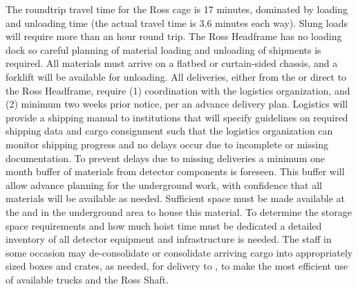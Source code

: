 The roundtrip travel time for the Ross cage is 17 minutes, dominated by loading and unloading time (the actual travel time is 3.6 minutes each way).
Slung loads will require more than an hour round trip.
The Ross Headframe has no loading dock so careful planning of material loading and unloading of shipments is required.
All materials must arrive on a flatbed or curtain-sided chassis, and a
forklift will be available for unloading.
All deliveries, either from the  or direct to the Ross Headframe, require (1) coordination with the  logistics organization, and (2) minimum two weeks prior notice, per an advance delivery plan.
Logistics will provide a shipping manual to  institutions that will specify guidelines on required shipping data and cargo consignment such that the logistics organization can monitor shipping progress and no delays occur due to incomplete or missing documentation.
To prevent delays due to missing deliveries a minimum one month buffer of materials from detector components is foreseen.
This buffer will allow advance planning for the underground work, with confidence that all materials will be available as needed.
Sufficient space must be made available at the  and in the underground area to house this material.
To determine the storage space requirements and how much hoist time must be dedicated a detailed inventory of all detector equipment and infrastructure is needed.
The  staff in some occasion may de-consolidate or consolidate arriving cargo into appropriately sized boxes and crates, as needed, for delivery to , to make the most efficient use of available trucks and the Ross Shaft.

